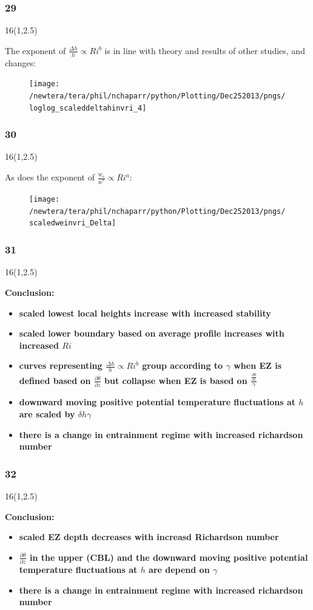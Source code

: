 \documentclass{beamer}
\newcommand\FrameText[1]{
\begin{textblock}{16}(1,2.5)
\raggedright #1
\end{textblock}}
\begin{document}
\begin{frame}
\frametitle{29}
\FrameText{The exponent of $\frac{\Delta h}{h} \propto Ri^{b}$ is in line with theory and results of other studies, and changes:
}
\begin{figure}
\centering
\texttt{[image: /newtera/tera/phil/nchaparr/python/Plotting/Dec252013/pngs/loglog\_scaleddeltahinvri\_4]}
\end{figure}
\end{frame}

\begin{frame}
\frametitle{30}
\FrameText{As does the exponent of $\frac{w_{e}}{w^{*}} \propto  Ri^{a}$:}
\begin{figure}
\texttt{[image: /newtera/tera/phil/nchaparr/python/Plotting/Dec252013/pngs/scaledweinvri\_Delta]}
\end{figure}
\end{frame}

\begin{frame}
\frametitle{31}
\FrameText{\bf{\large Conclusion:}
\begin{itemize}
\item \bf{\large scaled lowest local heights increase with increased stability}
\item \bf{\large scaled lower boundary based on average profile increases with increased $Ri$}
\item \bf{\large curves representing  $\frac{\Delta h}{h} \propto Ri ^{b}$ group according to $\gamma$ when EZ is defined based on $\frac{\partial \overline{\theta}}{\partial z}$ but collapse when EZ is based on $\frac{\frac{\partial \overline{\theta}}{\partial z}}{\gamma}$} 
\item \bf{\large downward moving positive potential temperature fluctuations at $h$ are scaled by $\delta h \gamma$}
\item \bf{\large there is a change in entrainment regime with increased richardson number}
\end{itemize}
}
\end{frame}

\begin{frame}
\frametitle{32}
\FrameText{\bf{\large Conclusion:}
\begin{itemize}
\item \bf{\large scaled EZ depth decreases with increasd Richardson number}
\item \bf{\large $\frac{\partial \overline{\theta}}{\partial z}$ in the upper (CBL) and the downward moving positive potential temperature fluctuations at $h$ are depend on $\gamma$}
\item \bf{\large there is a change in entrainment regime with increased richardson number}
\end{itemize}
}
\end{frame}
\end{document}
